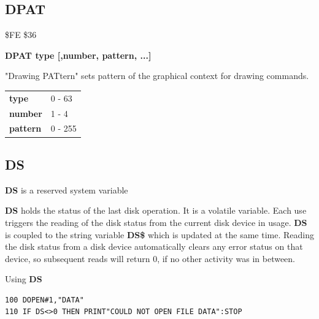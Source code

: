 
\newpage
\subsection{DPAT}
\begin{description}[leftmargin=2cm,style=nextline]
\item [Token:] \$FE \$36
\item [Format:] {\bf DPAT type [,number, pattern, ...]}
\item [Usage:]
   "Drawing PATtern" sets pattern
   of the graphical context for drawing commands.

\ttfamily
\begin{tabular}{|l|l|}
\hline
   {\bf type}       &  0 - 63 \\
   {\bf number}     &  1 - 4 \\
   {\bf pattern}    &  0 - 255 \\
\hline
\end{tabular}
\end{description}


\newpage
\subsection{DS}
\begin{description}[leftmargin=2cm,style=nextline]
\item [Format:] {\bf DS} is a reserved system variable
\item [Usage:]  {\bf DS} holds the status of the last disk operation.
                It is a volatile variable.
                Each use triggers the reading of the disk status
                from the current disk device in usage.
                {\bf DS} is coupled to the string variable {\bf DS\$}
                which is updated at the same time.
                Reading the disk status from a disk device automatically
                clears any error status on that device, so subsequent reads
                will return 0, if no other activity was in between.

\item [Example:] Using {\bf DS}
\begin{tcolorbox}[colback=black,coltext=white]
\verbatimfont{\codefont}
\begin{verbatim}
100 DOPEN#1,"DATA"
110 IF DS<>0 THEN PRINT"COULD NOT OPEN FILE DATA":STOP
\end{verbatim}
\end{tcolorbox}
\end{description}

